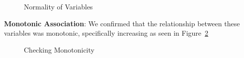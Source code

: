 \documentclass[
  letterpaper,
  DIV=11,
  numbers=noendperiod]{scrartcl}
\begin{document}
\begin{figure}


\caption{\label{fig-normality-activity}Normality of Variables}

\end{figure}%

\textbf{Monotonic Association}: We confirmed that the relationship
between these variables was monotonic, specifically increasing as seen
in Figure~\ref{fig-monotonic-activity}

\begin{figure}


\caption{\label{fig-monotonic-activity}Checking Monotonicity}

\end{figure}%
\end{document}
